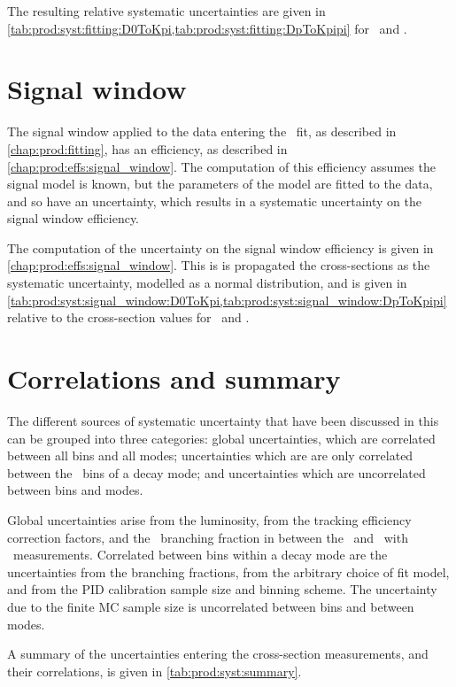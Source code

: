 The resulting relative systematic uncertainties are given in
\cref{tab:prod:syst:fitting:D0ToKpi,tab:prod:syst:fitting:DpToKpipi} for \DzToKpi\ and
\DpToKpipi.

\section{Signal window}
\label{chap:prod:syst:signal_window}

The signal window applied to the data entering the \lnipchisq\ fit, as
described in \cref{chap:prod:fitting}, has an efficiency, as described in
\cref{chap:prod:effs:signal_window}.
The computation of this efficiency assumes the signal model is known, but the
parameters of the model are fitted to the data, and so have an uncertainty,
which results in a systematic uncertainty on the signal window efficiency.

The computation of the uncertainty on the signal window efficiency is given in
\cref{chap:prod:effs:signal_window}.
This is is propagated the cross-sections as the systematic uncertainty,
modelled as a normal distribution, and is given in
\cref{tab:prod:syst:signal_window:D0ToKpi,tab:prod:syst:signal_window:DpToKpipi} relative
to the cross-section values for \DzToKpi\ and \DpToKpipi.

\section{Correlations and summary}
\label{chap:prod:syst:correlations}

The different sources of systematic uncertainty that have been discussed in
this  can be grouped into three categories:
global uncertainties, which are correlated between all bins and all modes;
uncertainties which are are only correlated
between the \pTy\ bins of a decay mode; and uncertainties which are
uncorrelated between bins and modes.

Global uncertainties arise from the luminosity, from the tracking efficiency
correction factors, and the \DzToKpi\ branching fraction in between the
\DzToKpi\ and \DstToDzpi\ with \DzToKpi\ measurements.
Correlated between bins within a decay mode are the uncertainties from the
branching fractions, from the arbitrary choice of fit model, and from the
\ac{PID} calibration sample size and binning scheme.
The uncertainty due to the finite \ac{MC} sample size is uncorrelated between
bins and between modes.

A summary of the uncertainties entering the cross-section measurements, and
their correlations, is given in \cref{tab:prod:syst:summary}.

